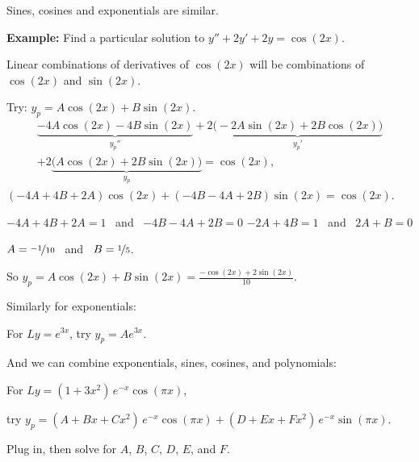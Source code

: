 \documentclass[10pt,aspectratio=169]{beamer}
\begin{document}
\begin{frame}
Sines, cosines and exponentials are similar.

\pause
\medskip

\textbf{Example:}
Find a particular solution to
\quad
$y''+2y'+2y = \cos (2x)$.

\medskip
\pause

Linear combinations of derivatives of $\cos(2x)$ will be combinations
of $\cos (2x)$ and $\sin (2x)$.

\medskip
\pause

Try:
\quad
$y_p = A \cos (2x) + B \sin (2x)$.
\pause
\begin{multline*}
\underbrace{-4 A \cos (2x) - 4 B \sin (2x)}_{y_p''}
+2 \underbrace{\bigl(-2A \sin (2x) + 2B \cos (2x)\bigr)}_{y_p'}
\\
+
2 \underbrace{\bigl(A \cos (2x) + 2B \sin (2x)\bigr)}_{y_p}
= \cos (2x) ,
\end{multline*}
\pause
\thus\quad
$(-4A+4B+2A) \cos(2x) +
(-4B-4A+2B) \sin(2x)
= \cos(2x)$.

\medskip
\pause
\thus \quad $-4A + 4B + 2A = 1$ ~and~
$-4B - 4A + 2B = 0$
\pause
\wthus
$-2A+4B =1$ ~and~ $2A+B=0$

\pause
\thus
\quad
$A=\nicefrac{-1}{10}$ ~and~ $B=\nicefrac{1}{5}$.

\medskip
\pause

So \quad
$\displaystyle
y_p = A \cos (2x) + B \sin (2x) = \frac{-\cos (2x) + 2 \sin (2x)}{10} .
$
\end{frame}

\begin{frame}
Similarly for exponentials:

\medskip

For
\quad $Ly = e^{3x}$, \quad try
$y_p = A e^{3x}$.

\medskip
\pause

And we can combine exponentials, sines, cosines, and polynomials:

\medskip
\pause

For
\quad
$Ly = (1+3x^2)\,e^{-x}\cos (\pi x)$,

\medskip
try
$y_p = (A + Bx + Cx^2)\,e^{-x} \cos (\pi x) + 
(D + Ex + Fx^2)\,e^{-x} \sin (\pi x)$.

\medskip
\pause

Plug in, then solve for $A$, $B$, $C$, $D$, $E$, and $F$.
\end{frame}
\end{document}
